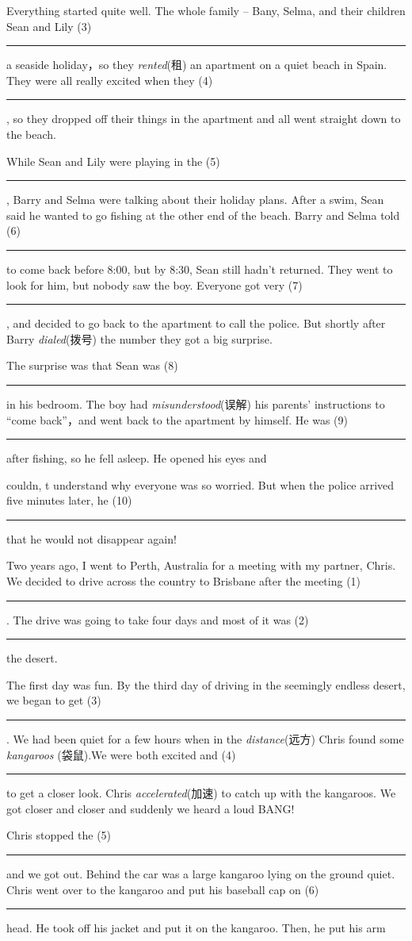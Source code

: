 \documentclass{article}
\newcommand{\kong}{\rule{4em}{0.5pt} }
\begin{document}
Everything started quite well. The whole family -- Bany, Selma, and their 
children Sean and Lily (3)\kong a seaside 
holiday，so they \textit{rented}\/(租) an apartment on a quiet beach in Spain. They were all 
really excited when they (4)\kong , so they 
dropped off their things in the apartment and all went straight down to the 
beach.

While Sean and Lily were playing in the (5)\kong , 
Barry and Selma were talking about their holiday plans. After a swim, Sean 
said he wanted to go fishing at the other end of the beach. Barry and Selma 
told (6)\kong to come back before 8:00, but by 8:30, 
Sean still hadn't returned. They went to look for him, but nobody saw the 
boy. Everyone got very (7)\kong , and decided to 
go back to the apartment to call the police. But shortly after Barry 
\textit{dialed}\/(拨号) the number they got a big surprise.

The surprise was that Sean was (8)\kong in his 
bedroom. The boy had \textit{misunderstood}\/(误解) his parents' instructions to ``come back''，and 
went back to the apartment by himself. He was 
(9)\kong  after fishing, so he fell 
asleep. He opened his eyes and

couldn, t understand why everyone was so worried. But when the police 
arrived five minutes later, he (10)\kong that he would 
not disappear again!

\begin{center}
\end{center}

Two years ago, I went to Perth, Australia for a meeting with my partner, 
Chris. We decided to drive across the country to Brisbane after the meeting 
(1)\kong . The drive was going to take four days 
and most of it was (2)\kong the desert. 

The first day was fun. By the third day of driving in the seemingly endless 
desert, we began to get (3)\kong . We had been 
quiet for a few hours when in the \textit{distance}\/(远方) Chris found some 
\textit{kangaroos} (袋鼠).We were both excited and (4)\kong  
to get a closer look. Chris \textit{accelerated}\/(加速) to catch up with the kangaroos. We got 
closer and closer and suddenly we heard a loud BANG!

Chris stopped the (5)\kong  and we got out. Behind the 
car was a large kangaroo lying on the ground quiet. Chris went over to the 
kangaroo and put his baseball cap on (6)\kong  head. He 
took off his jacket and put it on the kangaroo. Then, he put his arm
\end{document}
